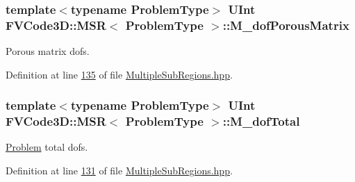 \subsubsection[{\texorpdfstring{M\+\_\+dof\+Porous\+Matrix}{M_dofPorousMatrix}}]{\setlength{\rightskip}{0pt plus 5cm}template$<$typename Problem\+Type$>$ {\bf U\+Int} {\bf F\+V\+Code3\+D\+::\+M\+SR}$<$ Problem\+Type $>$\+::M\+\_\+dof\+Porous\+Matrix\hspace{0.3cm}{\ttfamily [private]}}\hypertarget{classFVCode3D_1_1MSR_a04c41dbcba341c70158af3db7b69916e}{}\label{classFVCode3D_1_1MSR_a04c41dbcba341c70158af3db7b69916e}


Porous matrix dofs. 



Definition at line \hyperlink{MultipleSubRegions_8hpp_source_l00135}{135} of file \hyperlink{MultipleSubRegions_8hpp_source}{Multiple\+Sub\+Regions.\+hpp}.

\subsubsection[{\texorpdfstring{M\+\_\+dof\+Total}{M_dofTotal}}]{\setlength{\rightskip}{0pt plus 5cm}template$<$typename Problem\+Type$>$ {\bf U\+Int} {\bf F\+V\+Code3\+D\+::\+M\+SR}$<$ Problem\+Type $>$\+::M\+\_\+dof\+Total\hspace{0.3cm}{\ttfamily [private]}}\hypertarget{classFVCode3D_1_1MSR_a52fc7223f5d641543781b1224e686610}{}\label{classFVCode3D_1_1MSR_a52fc7223f5d641543781b1224e686610}


\hyperlink{classFVCode3D_1_1Problem}{Problem} total dofs. 



Definition at line \hyperlink{MultipleSubRegions_8hpp_source_l00131}{131} of file \hyperlink{MultipleSubRegions_8hpp_source}{Multiple\+Sub\+Regions.\+hpp}.

